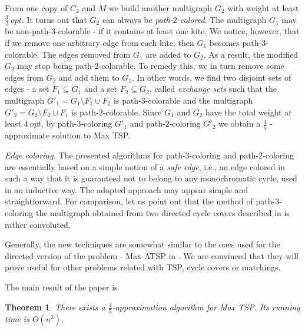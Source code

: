 \documentclass[a4, 11pt]{article}
\newcommand{\<}{\langle}
\renewcommand{\>}{\rangle}
\newtheorem{theorem}{Theorem}
\begin{document}
 From one copy of $C_2$ and $M$ we build another multigraph $G_2$ with weight at least $\frac 32 \ opt$. It turns out that $G_2$ can always be {\em path-$2$-colored}. The multigraph $G_1$ may be non-path-$3$-colorable - if it contains at least one kite.  We notice, however, that if we remove one arbitrary edge from each kite, then $G_1$ becomes path-$3$-colorable.  The edges removed from $G_1$ are added to $G_2$. As a result,
the modified $G_2$ may stop being path-$2$-colorable. To remedy this, we in turn remove some edges from $G_2$ and add them to $G_1$.  In other words, we find  two disjoint sets of edges - a set $F_1 \subseteq G_1$ and a set $F_2 \subseteq G_2$, called {\em exchange sets} such that the multigraph $G'_1 = G_1 \setminus F_1 \cup F_2$ is path-$3$-colorable and the multigraph $G'_2 = G_2 \setminus F_2 \cup F_1$ is path-$2$-colorable. Since $G_1$ and $G_2$ have the total weight at least $4\  opt$, by path-$3$-coloring $G'_1$ and path-$2$-coloring $G'_2$ we obtain a $\frac 45$ - approximate solution to Max TSP.

{\em Edge coloring.} The presented algorithms for path-$3$-coloring and path-$2$-coloring are essentially based on a simple notion of a {\em safe edge}, i.e., 
an edge colored in such a way that it is guaranteed not to belong to any monochromatic cycle, used in an inductive way.  The adopted approach may appear simple and straightforward. For comparison, let us point out that the method of path-$3$-coloring the multigraph obtained from two directed cycle covers described in \cite{Svir} is rather convoluted.

Generally, the new techniques are somewhat similar to the ones used for the directed version of the problem - Max ATSP in \cite{Pal34}.
We are convinced that they will prove useful for other problems related with TSP, cycle covers or matchings.

The main result of the paper is
\begin{theorem}
There exists a $\frac 45$-approximation algorithm for Max TSP. Its running time is $O(n^3)$.
\end{theorem}
\end{document}
